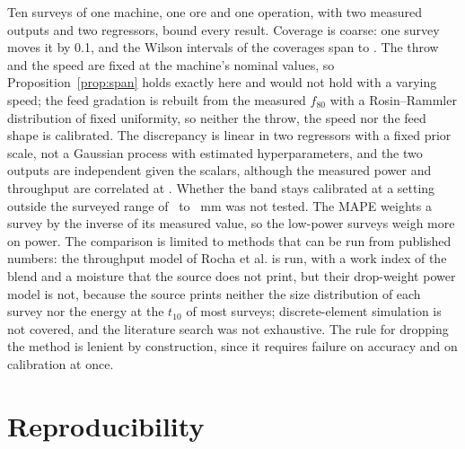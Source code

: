 \documentclass[journal]{IEEEtran}
\begin{document}
Ten surveys of one machine, one ore and one operation, with two measured outputs and two regressors, bound every result.
Coverage is coarse: one survey moves it by 0.1, and the Wilson intervals of the coverages span \cbTphCovLo{} to
\cbKwCovHi. The
throw and the speed are fixed at the machine's nominal values, so Proposition~\ref{prop:span} holds exactly here and would
not hold with a varying speed; the feed gradation is rebuilt from the measured $f_{80}$ with a Rosin--Rammler distribution
of fixed uniformity, so neither the throw, the speed nor the feed shape is calibrated. The discrepancy is linear in two
regressors with a fixed prior scale, not a Gaussian process with estimated hyperparameters, and the two outputs are
independent given the scalars, although the measured power and throughput are correlated at \rKwTph. Whether the band stays
calibrated at a setting outside the surveyed range of \cssMin\ to \cssMax~mm was not tested. The MAPE weights a survey by the
inverse of its measured value, so the low-power surveys weigh more on power. The comparison is limited to methods that can be run from
published numbers: the throughput model of Rocha et al. is run, with a work index of the blend and a moisture that the
source does not print, but their drop-weight power model is not, because the source prints neither the size distribution
of each survey nor the energy at the $t_{10}$ of most surveys; discrete-element simulation is not covered, and the
literature search was not exhaustive. The rule for
dropping the method is lenient by construction, since it requires failure on accuracy and on calibration at once.

\section{Reproducibility}\label{sec:repro}
\end{document}
